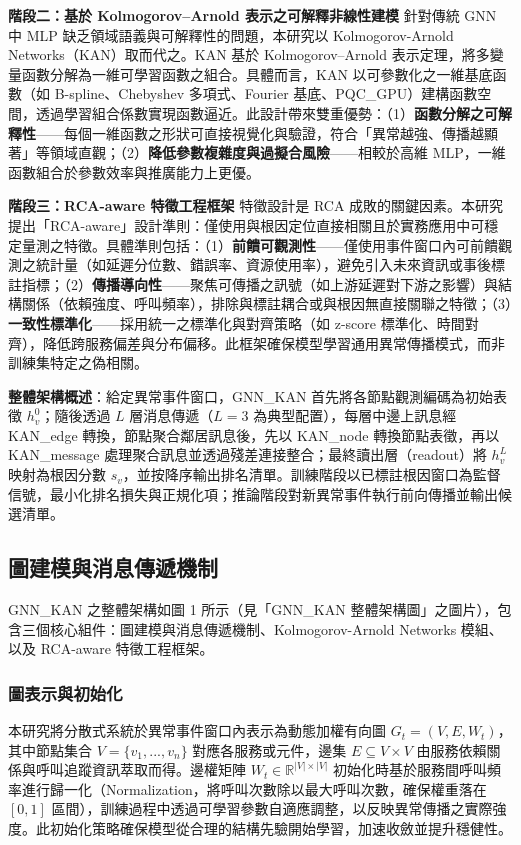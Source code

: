 \documentclass[10pt,a4paper,twocolumn]{article}
\begin{document}
\textbf{階段二：基於 Kolmogorov–Arnold 表示之可解釋非線性建模}  
針對傳統 GNN 中 MLP 缺乏領域語義與可解釋性的問題，本研究以 Kolmogorov-Arnold Networks（KAN）取而代之。KAN 基於 Kolmogorov–Arnold 表示定理，將多變量函數分解為一維可學習函數之組合。具體而言，KAN 以可參數化之一維基底函數（如 B-spline、Chebyshev 多項式、Fourier 基底、PQC\_GPU）建構函數空間，透過學習組合係數實現函數逼近。此設計帶來雙重優勢：（1）\textbf{函數分解之可解釋性}——每個一維函數之形狀可直接視覺化與驗證，符合「異常越強、傳播越顯著」等領域直觀；（2）\textbf{降低參數複雜度與過擬合風險}——相較於高維 MLP，一維函數組合於參數效率與推廣能力上更優。

\textbf{階段三：RCA-aware 特徵工程框架}  
特徵設計是 RCA 成敗的關鍵因素。本研究提出「RCA-aware」設計準則：僅使用與根因定位直接相關且於實務應用中可穩定量測之特徵。具體準則包括：（1）\textbf{前饋可觀測性}——僅使用事件窗口內可前饋觀測之統計量（如延遲分位數、錯誤率、資源使用率），避免引入未來資訊或事後標註指標；（2）\textbf{傳播導向性}——聚焦可傳播之訊號（如上游延遲對下游之影響）與結構關係（依賴強度、呼叫頻率），排除與標註耦合或與根因無直接關聯之特徵；（3）\textbf{一致性標準化}——採用統一之標準化與對齊策略（如 z-score 標準化、時間對齊），降低跨服務偏差與分布偏移。此框架確保模型學習通用異常傳播模式，而非訓練集特定之偽相關。

\textbf{整體架構概述}：給定異常事件窗口，GNN\_KAN 首先將各節點觀測編碼為初始表徵 $h_v^0$；隨後透過 $L$ 層消息傳遞（$L=3$ 為典型配置），每層中邊上訊息經 KAN\_edge 轉換，節點聚合鄰居訊息後，先以 KAN\_node 轉換節點表徵，再以 KAN\_message 處理聚合訊息並透過殘差連接整合；最終讀出層（readout）將 $h_v^L$ 映射為根因分數 $s_v$，並按降序輸出排名清單。訓練階段以已標註根因窗口為監督信號，最小化排名損失與正規化項；推論階段對新異常事件執行前向傳播並輸出候選清單。

\subsection{圖建模與消息傳遞機制}

GNN\_KAN 之整體架構如圖 1 所示（見「GNN\_KAN 整體架構圖」之圖片），包含三個核心組件：圖建模與消息傳遞機制、Kolmogorov-Arnold Networks 模組、以及 RCA-aware 特徵工程框架。

\subsubsection{圖表示與初始化}

本研究將分散式系統於異常事件窗口內表示為動態加權有向圖 $G_t = (V, E, W_t)$，其中節點集合 $V = \{v_1, ..., v_n\}$ 對應各服務或元件，邊集 $E \subseteq V \times V$ 由服務依賴關係與呼叫追蹤資訊萃取而得。邊權矩陣 $W_t \in \mathbb{R}^{|V| \times |V|}$ 初始化時基於服務間呼叫頻率進行歸一化（Normalization，將呼叫次數除以最大呼叫次數，確保權重落在 $[0, 1]$ 區間），訓練過程中透過可學習參數自適應調整，以反映異常傳播之實際強度。此初始化策略確保模型從合理的結構先驗開始學習，加速收斂並提升穩健性。
\end{document}
